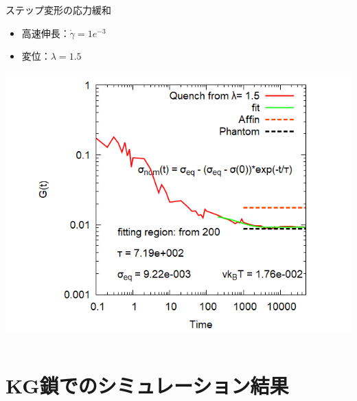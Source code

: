 \documentclass[12pt, dvipdfmx]{beamer}
\begin{document}
\begin{frame}
\begin{columns}[totalwidth=\linewidth]
\begin{exampleblock}{ステップ変形の応力緩和}
\begin{itemize}
                        \item 高速伸長：$\dot{\gamma} = 1e^{-3}$
                        \item 変位：$\lambda = 1.5$
                    \end{itemize}
					\begin{center}
                        \includegraphics[width=.9\columnwidth]{gt_sunuke.png}
                    \end{center}
				\end{exampleblock}
		\end{columns}
\end{frame}

\section{KG鎖でのシミュレーション結果}
\end{document}
